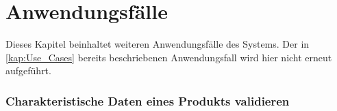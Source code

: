 \chapter{Anwendungsfälle}\label{kap:analyse_use_cases}

Dieses Kapitel beinhaltet weiteren Anwendungsfälle des Systems. Der in \autoref{kap:Use_Cases} bereits beschriebenen Anwendungsfall wird hier nicht erneut aufgeführt.  

\subsection{Charakteristische Daten eines Produkts validieren}

